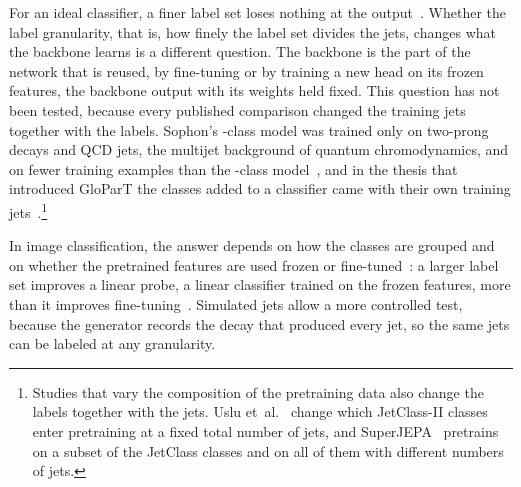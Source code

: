 For an ideal classifier, a finer label set loses nothing at the output~\cite[Sec.~III, Properties~1
and~2]{sophon}. Whether the label granularity, that is, how finely the label set divides the jets, changes
what the backbone learns is a different question. The backbone is the part of the network that is reused,
by fine-tuning or by training a new head on its frozen features, the backbone output with its weights held
fixed. This question has not been tested, because every published comparison changed the training jets
together with the labels. Sophon's \LitSophonAblationNClasses-class model was trained only on two-prong
decays and QCD jets, the multijet background of quantum chromodynamics, and on fewer training examples than the \Kfull-class model~\cite[Sec.~III,
App.~B.2]{sophon}, and in the thesis that introduced GloParT the classes added to a classifier came with
their own training jets~\cite[Sec.~11.4.1]{glopart}.\footnote{Studies that vary the composition of the
pretraining data also change the labels together with the jets. Uslu et~al.~\cite{datacomp} change which
JetClass-II classes enter pretraining at a fixed total number of jets, and SuperJEPA~\cite{superjepa}
pretrains on a subset of the JetClass classes and on all of them with different numbers of jets.}

In image classification, the answer depends on how the classes are grouped and on whether the pretrained
features are used frozen or fine-tuned~\cite{huh,hong,mahajan,kornblith}: a larger label set improves a linear
probe, a linear classifier trained on the frozen features, more than it improves fine-tuning~\cite{mahajan}.
Simulated jets allow a more controlled test,
because the generator records the decay that produced every jet, so the same jets can be labeled at any
granularity.

